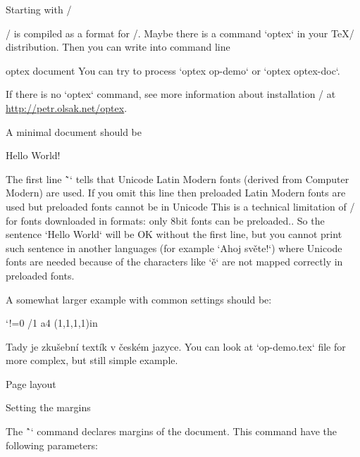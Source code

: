 

\let\new=\relax

\sec Starting with \OpTeX/

\new
\OpTeX/ is compiled as a format for \LuaTeX/. Maybe there is a command
`optex` in your \TeX/ distribution. Then you can write into command line

\begtt
optex document
\endtt
%
You can try to process `optex op-demo` or `optex optex-doc`.

If there is no `optex` command, see more information about installation
\OpTeX/ at \url{http://petr.olsak.net/optex}. 

A minimal document should be

\begtt
\fontfam[LMfonts]
Hello World! \bye
\endtt

The first line \~`\fontfam[LMfonts]` tells that Unicode Latin Modern 
fonts (derived from Computer Modern) are used. If you omit this line then
preloaded Latin Modern fonts are used but preloaded fonts cannot be in
Unicode\fnote
{This is a technical limitation of \LuaTeX/ for fonts downloaded in formats:
only 8bit fonts can be preloaded.}.
So the sentence `Hello World` will be OK without the first line, but you 
cannot print such sentence in another languages (for example `Ahoj světe!`) 
where Unicode fonts are needed
because of the characters like `ě` are not mapped correctly in preloaded
fonts.

A somewhat larger example with common settings should be:

\begtt \catcode`!=0
\fontfam[Termes]  %
\typosize[11/13]  %
\margins/1 a4 (1,1,1,1)in %
\cslang           %

Tady je zkušební textík v českém jazyce.
\bye
\endtt
%
You can look at `op-demo.tex` file for more complex, but still simple example.


\sec Page layout

\secc[marg] Setting the margins

The \^`\margins` command declares margins of the document. This command have
the following parameters:


